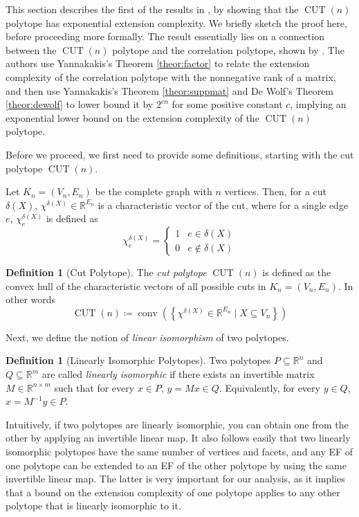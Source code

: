 \documentclass{article}
\theoremstyle{definition}
\newtheorem{definition}[theorem]{Definition}
\theoremstyle{remark}
\newcommand{\conv}{\operatorname{conv}}
\newcommand{\CUT}{\operatorname{CUT}}
\renewcommand{\R}{\mathbb{R}}
\begin{document}
This section describes the first of the results in \cite{fiorini}, by showing that the $\CUT(n)$ polytope has exponential extension complexity. We briefly sketch the proof here, before proceeding more formally. The result essentially lies on a connection between the $\CUT(n)$ polytope and the correlation polytope, shown by \cite{de-simone}. The authors use Yannakakis's Theorem \ref{theor:factor} to relate the extension complexity of the correlation polytope with the nonnegative rank of a matrix, and then use Yannakakis's Theorem \ref{theor:suppmat} and De Wolf's Theorem \ref{theor:dewolf} to lower bound it by $2^{cn}$ for some positive constant $c$, implying an exponential lower bound on the extension complexity of the $\CUT(n)$ polytope.

Before we proceed, we first need to provide some definitions, starting with the cut polytope $\CUT(n)$.

Let $K_n = (V_n, E_n)$ be the complete graph with $n$ vertices. Then, for a cut $\delta(X)$, $\chi^{\delta(X)} \in \R^{E_n}$ is a characteristic vector of the cut, where for a single edge $e$, $\chi^{\delta(X)}_e$ is defined as
\[
\chi^{\delta(X)}_e =
\begin{cases}
1 & e \in \delta(X) \\
0 & e \notin \delta(X)
\end{cases}
\]

\begin{definition}[Cut Polytope]\label{def:cut-poly}
The \textit{cut polytope} $\CUT(n)$ is defined as the convex hull of the characteristic vectors of all possible cuts in $K_n = (V_n, E_n)$. In other words
\[
\CUT(n) \coloneqq \conv\left( \left\{ \chi^{\delta(X)} \in \R^{E_n} \mid X \subseteq V_n \right\} \right)
\]
\end{definition}

Next, we define the notion of \textit{linear isomorphism} of two polytopes.

\begin{definition}[Linearly Isomorphic Polytopes]\label{def:lin-iso}
Two polytopes $P \subseteq \R^n$ and $Q \subseteq \R^m$ are called \textit{linearly isomorphic} if there exists an invertible matrix $M \in \R^{n \times m}$ such that for every $x \in P$, $y = Mx \in Q$. Equivalently, for every $y \in Q$, $x = M^{-1}y \in P$.
\end{definition}

Intuitively, if two polytopes are linearly isomorphic, you can obtain one from the other by applying an invertible linear map. It also follows easily that two linearly isomorphic polytopes have the same number of vertices and facets, and any EF of one polytope can be extended to an EF of the other polytope by using the same invertible linear map. The latter is very important for our analysis, as it implies that a bound on the extension complexity of one polytope applies to any other polytope that is linearly isomorphic to it.
\end{document}
